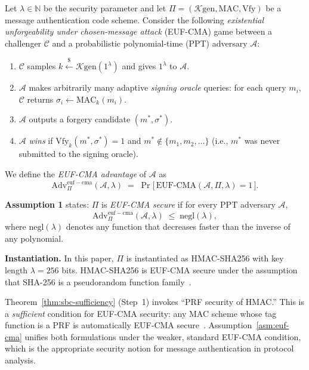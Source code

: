 \begin{assumption}
\label{asm:euf-cma}
Let $\lambda \in \mathbb{N}$ be the security parameter and let
$\Pi = (\mathcal{K}\text{gen}, \mathrm{MAC}, \mathrm{Vfy})$ be a
message authentication code scheme.  Consider the following
\emph{existential unforgeability under chosen-message attack}
(EUF-CMA) game between a challenger $\mathcal{C}$ and a probabilistic
polynomial-time (PPT) adversary $\mathcal{A}$:

\begin{enumerate}[label=(\arabic*)]
  \item $\mathcal{C}$ samples $k \xleftarrow{\$} \mathcal{K}\text{gen}(1^\lambda)$
        and gives $1^\lambda$ to $\mathcal{A}$.
  \item $\mathcal{A}$ makes arbitrarily many adaptive \emph{signing oracle}
        queries: for each query $m_i$, $\mathcal{C}$ returns
        $\sigma_i \leftarrow \mathrm{MAC}_k(m_i)$.
  \item $\mathcal{A}$ outputs a forgery candidate $(m^*, \sigma^*)$.
  \item $\mathcal{A}$ \emph{wins} if $\mathrm{Vfy}_k(m^*, \sigma^*) = 1$
        and $m^* \notin \{m_1, m_2, \ldots\}$ (i.e., $m^*$ was never
        submitted to the signing oracle).
\end{enumerate}

We define the \emph{EUF-CMA advantage} of $\mathcal{A}$ as
\[
  \mathrm{Adv}^{\mathrm{euf-cma}}_{\Pi}(\mathcal{A}, \lambda)
  \;=\;
  \Pr\!\bigl[\,\mathrm{EUF\text{-}CMA}(\mathcal{A}, \Pi, \lambda) = 1\,\bigr].
\]

\textbf{Assumption 1} states: $\Pi$ is \emph{EUF-CMA secure} if for
every PPT adversary $\mathcal{A}$,
\[
  \mathrm{Adv}^{\mathrm{euf-cma}}_{\Pi}(\mathcal{A}, \lambda)
  \;\leq\;
  \mathrm{negl}(\lambda),
\]
where $\mathrm{negl}(\lambda)$ denotes any function that decreases
faster than the inverse of any polynomial.

\textbf{Instantiation.}  In this paper, $\Pi$ is instantiated as
HMAC-SHA256 with key length $\lambda = 256$ bits.
HMAC-SHA256 is EUF-CMA secure under the assumption that SHA-256 is a
pseudorandom function family~\cite{bellare1996keying}.
\end{assumption}

\begin{remark}
\label{rem:prf-euf}
Theorem~\ref{thm:sbc-sufficiency} (Step~1) invokes ``PRF security
of HMAC.''  This is a \emph{sufficient} condition for EUF-CMA security:
any MAC scheme whose tag function is a PRF is automatically EUF-CMA
secure~\cite{katz2020introduction}.  Assumption~\ref{asm:euf-cma}
unifies both formulations under the weaker, standard EUF-CMA condition,
which is the appropriate security notion for message authentication in
protocol analysis.
\end{remark}

